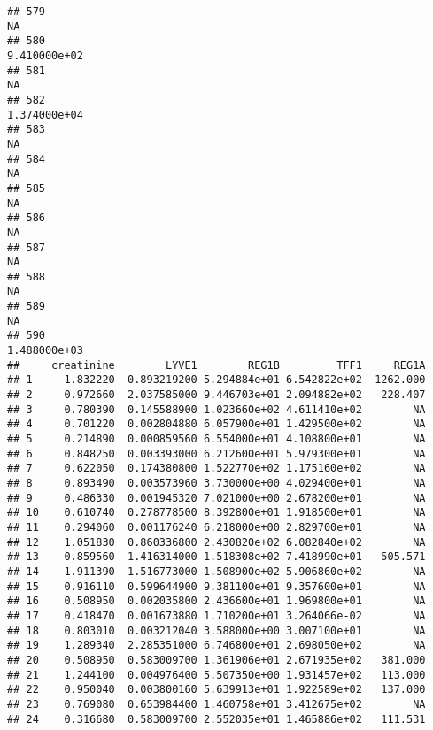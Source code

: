 \documentclass[
]{article}
\begin{document}
\begin{verbatim}
## 579                                                                         NA
## 580                                                               9.410000e+02
## 581                                                                         NA
## 582                                                               1.374000e+04
## 583                                                                         NA
## 584                                                                         NA
## 585                                                                         NA
## 586                                                                         NA
## 587                                                                         NA
## 588                                                                         NA
## 589                                                                         NA
## 590                                                               1.488000e+03
##     creatinine        LYVE1        REG1B         TFF1     REG1A
## 1     1.832220  0.893219200 5.294884e+01 6.542822e+02  1262.000
## 2     0.972660  2.037585000 9.446703e+01 2.094882e+02   228.407
## 3     0.780390  0.145588900 1.023660e+02 4.611410e+02        NA
## 4     0.701220  0.002804880 6.057900e+01 1.429500e+02        NA
## 5     0.214890  0.000859560 6.554000e+01 4.108800e+01        NA
## 6     0.848250  0.003393000 6.212600e+01 5.979300e+01        NA
## 7     0.622050  0.174380800 1.522770e+02 1.175160e+02        NA
## 8     0.893490  0.003573960 3.730000e+00 4.029400e+01        NA
## 9     0.486330  0.001945320 7.021000e+00 2.678200e+01        NA
## 10    0.610740  0.278778500 8.392800e+01 1.918500e+01        NA
## 11    0.294060  0.001176240 6.218000e+00 2.829700e+01        NA
## 12    1.051830  0.860336800 2.430820e+02 6.082840e+02        NA
## 13    0.859560  1.416314000 1.518308e+02 7.418990e+01   505.571
## 14    1.911390  1.516773000 1.508900e+02 5.906860e+02        NA
## 15    0.916110  0.599644900 9.381100e+01 9.357600e+01        NA
## 16    0.508950  0.002035800 2.436600e+01 1.969800e+01        NA
## 17    0.418470  0.001673880 1.710200e+01 3.264066e-02        NA
## 18    0.803010  0.003212040 3.588000e+00 3.007100e+01        NA
## 19    1.289340  2.285351000 6.746800e+01 2.698050e+02        NA
## 20    0.508950  0.583009700 1.361906e+01 2.671935e+02   381.000
## 21    1.244100  0.004976400 5.507350e+00 1.931457e+02   113.000
## 22    0.950040  0.003800160 5.639913e+01 1.922589e+02   137.000
## 23    0.769080  0.653984400 1.460758e+01 3.412675e+02        NA
## 24    0.316680  0.583009700 2.552035e+01 1.465886e+02   111.531

\end{verbatim}
\end{document}
